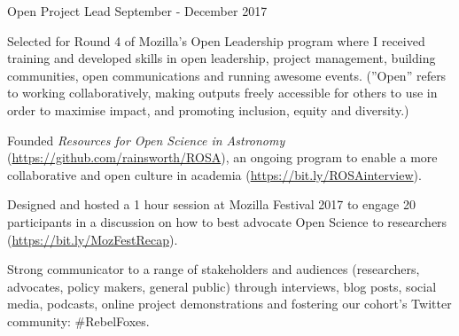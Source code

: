 \begin{cventries}
{    }
\cventry
    {Open Project Lead}
    {}
    {}
    {September - December 2017}
    {
      \begin{cvitems}
        \item{Selected for Round 4 of Mozilla's Open Leadership program where I received training and developed skills in open leadership, project management, building communities, open communications and running awesome events. (''Open'' refers to working collaboratively, making outputs freely accessible for others to use in order to maximise impact, and promoting inclusion, equity and diversity.)}
        \item{Founded \textit{Resources for Open Science in Astronomy} (\url{https://github.com/rainsworth/ROSA}), an ongoing program to enable a more collaborative and open culture in academia (\url{https://bit.ly/ROSAinterview}).}
        \item {Designed and hosted a 1 hour session at Mozilla Festival 2017 to engage 20 participants in a discussion on how to best advocate Open Science to researchers (\url{https://bit.ly/MozFestRecap}).}
        \item {Strong communicator to a range of stakeholders and audiences (researchers, advocates, policy makers, general public) through interviews, blog posts, social media, podcasts, online project demonstrations and fostering our cohort's Twitter community: \#RebelFoxes.}
      \end{cvitems}
    }    
\end{cventries}

